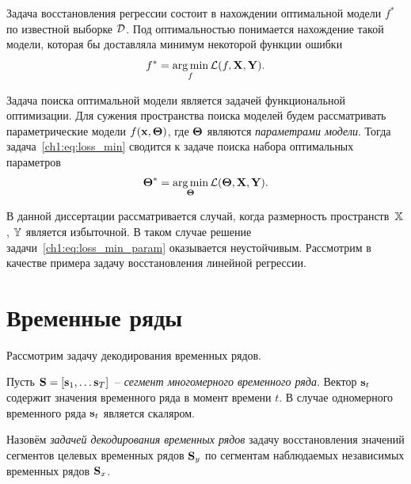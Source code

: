 Задача восстановления регрессии состоит в нахождении оптимальной модели $f^*$ по известной выборке $\mathcal{D}$. Под оптимальностью понимается нахождение такой модели, которая бы доставляла минимум некоторой функции ошибки
\begin{equation}
	f^* = \mathop{\arg \min}\limits_f \mathcal{L}(f, \mathbf{X}, \mathbf{Y}).
	\label{ch1:eq:loss_min}
\end{equation}

Задача поиска оптимальной модели является задачей функциональной оптимизации. 
Для сужения пространства поиска моделей будем рассматривать параметрические модели $f(\mathbf{x}, \boldsymbol{\Theta})$, где $\boldsymbol{\Theta}$ являются \textit{параметрами модели}. 
Тогда задача~\eqref{ch1:eq:loss_min} сводится к задаче поиска набора оптимальных параметров
\begin{equation}
\boldsymbol{\Theta}^* = \mathop{\arg \min}\limits_{\boldsymbol{\Theta}} \mathcal{L}(\boldsymbol{\Theta}, \mathbf{X}, \mathbf{Y}).
\label{ch1:eq:loss_min_param}
\end{equation}

В данной диссертации рассматривается случай, когда размерность пространств~$\mathbb{X}$, $\mathbb{Y}$ является избыточной. 
В таком случае решение задачи~\eqref{ch1:eq:loss_min_param} оказывается неустойчивым. 
Рассмотрим в качестве примера задачу восстановления линейной регрессии.

\section{Временные ряды}
\label{ch1:time_series}

Рассмотрим задачу декодирования временных рядов. 

\begin{definition}
Пусть $\mathbf{S} = [\mathbf{s}_1, \dots \mathbf{s}_T]$~-- \textit{сегмент многомерного временного ряда}.
Вектор $\mathbf{s}_t$ содержит значения временного ряда в момент времени $t$. 
В случае одномерного временного ряда $\mathbf{s}_t$ является скаляром.
\end{definition}

\begin{definition}
	Назовём \textit{задачей декодирования временных рядов} задачу восстановления значений сегментов целевых временных рядов $\mathbf{S}_y$ по сегментам наблюдаемых независимых временных рядов $\mathbf{S}_x$.
\end{definition}


